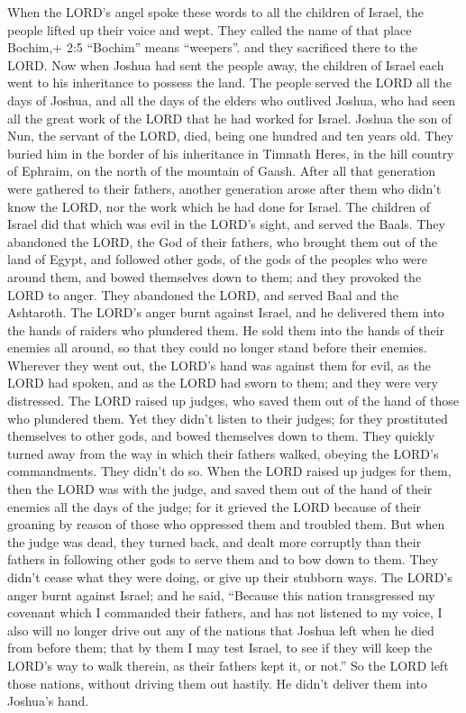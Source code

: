  When the LORD's angel spoke these words to all the children
of Israel, the people lifted up their voice and wept.  They
called the name of that place Bochim,+ 2:5 ``Bochim'' means ``weepers''.
and they sacrificed there to the LORD.  Now when Joshua had
sent the people away, the children of Israel each went to his
inheritance to possess the land.  The people served the LORD
all the days of Joshua, and all the days of the elders who outlived
Joshua, who had seen all the great work of the LORD that he had worked
for Israel.  Joshua the son of Nun, the servant of the LORD,
died, being one hundred and ten years old.  They buried him
in the border of his inheritance in Timnath Heres, in the hill country
of Ephraim, on the north of the mountain of Gaash.  After
all that generation were gathered to their fathers, another generation
arose after them who didn't know the LORD, nor the work which he had
done for Israel.  The children of Israel did that which was
evil in the LORD's sight, and served the Baals.  They
abandoned the LORD, the God of their fathers, who brought them out of
the land of Egypt, and followed other gods, of the gods of the peoples
who were around them, and bowed themselves down to them; and they
provoked the LORD to anger.  They abandoned the LORD, and
served Baal and the Ashtaroth.  The LORD's anger burnt
against Israel, and he delivered them into the hands of raiders who
plundered them. He sold them into the hands of their enemies all around,
so that they could no longer stand before their enemies. 
Wherever they went out, the LORD's hand was against them for evil, as
the LORD had spoken, and as the LORD had sworn to them; and they were
very distressed.  The LORD raised up judges, who saved them
out of the hand of those who plundered them.  Yet they
didn't listen to their judges; for they prostituted themselves to other
gods, and bowed themselves down to them. They quickly turned away from
the way in which their fathers walked, obeying the LORD's commandments.
They didn't do so.  When the LORD raised up judges for
them, then the LORD was with the judge, and saved them out of the hand
of their enemies all the days of the judge; for it grieved the LORD
because of their groaning by reason of those who oppressed them and
troubled them.  But when the judge was dead, they turned
back, and dealt more corruptly than their fathers in following other
gods to serve them and to bow down to them. They didn't cease what they
were doing, or give up their stubborn ways.  The LORD's
anger burnt against Israel; and he said, ``Because this nation
transgressed my covenant which I commanded their fathers, and has not
listened to my voice,  I also will no longer drive out any
of the nations that Joshua left when he died from before them;
 that by them I may test Israel, to see if they will keep
the LORD's way to walk therein, as their fathers kept it, or not.''
 So the LORD left those nations, without driving them out
hastily. He didn't deliver them into Joshua's hand.

